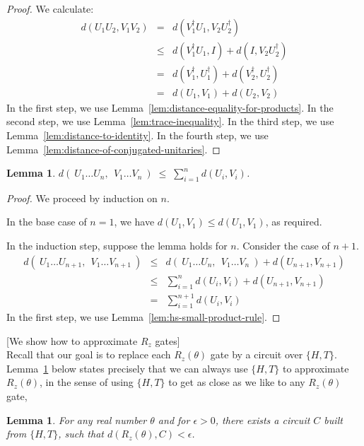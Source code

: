\documentclass[11pt]{article}
\def\({\begin{eqnarray*}}
\def\){\end{eqnarray*}}
\newtheorem{lemma}[theorem]{Lemma}
\begin{document}
\begin{proof}
We calculate:
\(
d(U_1 U_2, V_1 V_2) &=&
d(V_1^\dag U_1, V_2 U_2^\dag) 
\\ &\leq&
d(V_1^\dag U_1, I) + d(I, V_2 U_2^\dag)
\\ &=&
d(V_1^\dag, U_1^\dag) + d(V_2^\dag, U_2^\dag)
\\ &=&
d(U_1,V_1) + d(U_2,V_2)
\)
In the first step, we use Lemma~\ref{lem:distance-equality-for-products}.
In the second step, we use Lemma~\ref{lem:trace-inequality}.
In the third step, we use Lemma~\ref{lem:distance-to-identity}.
In the fourth step, we use Lemma~\ref{lem:distance-of-conjugated-unitaries}.
\end{proof}

\begin{lemma}
$d(\ U_1 \ldots U_n,\ \ V_1 \ldots V_n\ ) \;\leq\; \sum_{i=1}^n d(U_i,V_i)$.
\label{lem:hs-big-product-rule}
\end{lemma}

\begin{proof}
We proceed by induction on $n$.

In the base case of $n=1$, we have $d(U_1,V_1) \leq d(U_1,V_1)$, as required.

In the induction step, suppose the lemma holds for $n$.
Consider the case of $n+1$.
\(
d(\ U_1 \ldots U_{n+1},\ \ V_1 \ldots V_{n+1}\ ) 
&\leq&
d(\ U_1 \ldots U_n,\ \ V_1 \ldots V_n\ ) + d(U_{n+1},V_{n+1}) 
\\ &\leq&
\sum_{i=1}^n d(U_i,V_i) + d(U_{n+1},V_{n+1})
\\ &=&
\sum_{i=1}^{n+1} d(U_i,V_i) 
\)
In the first step, we use Lemma~\ref{lem:hs-small-product-rule}.
\end{proof}


\newpage

\hspace*{1cm}
   [We show how to approximate $R_z$ gates] \\
Recall that our goal is to replace each $R_z(\theta)$ gate by 
a circuit over $\{H,T\}$. 
Lemma~\ref{lem:approximation-of-rz} below states precisely that we can always
use $\{H, T\}$ to approximate $R_z(\theta)$, in the sense of using
$\{H, T\}$ to get as close as we like to any $R_z(\theta)$ gate,

\begin{lemma}
For any real number $\theta$ and for $\epsilon > 0$,
there exists a circuit $C$ built from $\{H, T\}$,
such that $d(R_z(\theta),C) < \epsilon$.
\label{lem:approximation-of-rz}
\end{lemma}
\end{document}
